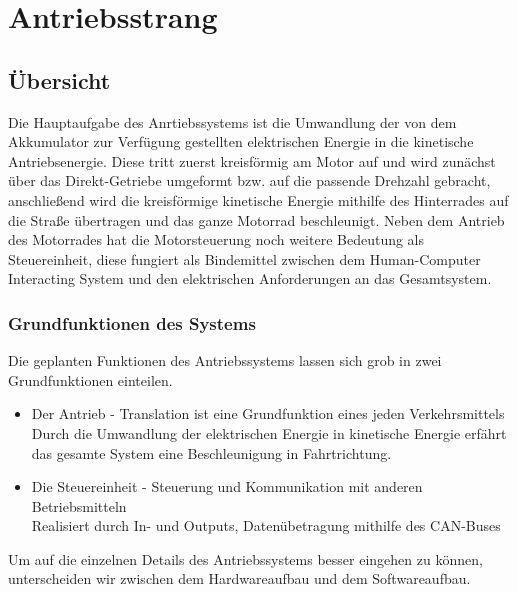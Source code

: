 \chapter{Antriebsstrang}


\section{Übersicht}
Die Hauptaufgabe des Anrtiebssystems ist die Umwandlung der von dem Akkumulator zur Verfügung gestellten elektrischen Energie in die kinetische Antriebsenergie. Diese tritt zuerst kreisförmig am Motor auf und wird zunächst über das Direkt-Getriebe umgeformt bzw. auf die passende Drehzahl gebracht, anschließend wird die kreisförmige kinetische Energie mithilfe des Hinterrades auf die Straße übertragen und das ganze Motorrad beschleunigt. Neben dem Antrieb des Motorrades hat die Motorsteuerung noch weitere Bedeutung als Steuereinheit, diese fungiert als Bindemittel zwischen dem Human-Computer Interacting System und den elektrischen Anforderungen an das Gesamtsystem.


\subsection{Grundfunktionen des Systems}
Die geplanten Funktionen des Antriebssystems lassen sich grob in zwei Grundfunktionen einteilen.

\begin{itemize}
	\item Der Antrieb - Translation ist eine Grundfunktion eines jeden Verkehrsmittels
	\\ Durch die Umwandlung der elektrischen Energie in kinetische Energie erfährt 
	\\ das gesamte System eine Beschleunigung in Fahrtrichtung.
	\item Die Steuereinheit - Steuerung und Kommunikation mit anderen Betriebsmitteln
	\\ Realisiert durch In- und Outputs, Datenübetragung mithilfe des CAN-Buses 
\end{itemize}

Um auf die einzelnen Details des Antriebssystems besser eingehen zu können, unterscheiden wir zwischen dem Hardwareaufbau und dem Softwareaufbau.

\newpage



